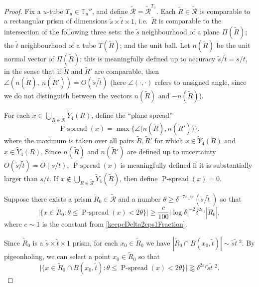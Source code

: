 \documentclass[letterpaper, reqno,11pt]{article}
\numberwithin{equation}{section}
\newcommand{\eps}{\varepsilon}
\newcommand{\tubes}{\mathbb{T}}
\numberwithin{thm}{section}
\theoremstyle{remark}
\begin{document}
\begin{proof}
\medskip


  Fix a $u$-tube $T_u\in\tubes_u''$, and define $\tilde{\mathcal{R}}=\tilde{\mathcal{R}}^{T_u}$. Each $\tilde R\in\tilde{\mathcal{R}}$ is comparable to a rectangular prism of dimensions $\tilde s\times\tilde t\times 1$, i.e.~$\tilde R$ is comparable to the intersection of the following three sets: the $\tilde s$ neighbourhood of a plane $\Pi(\tilde R)$; the $\tilde t$ neighbourhood of a tube $T(\tilde R)$; and the unit ball. Let $n(\tilde R)$ be the unit normal vector of $\Pi(\tilde R)$; this is meaningfully defined up to accuracy $\tilde s/ \tilde t=s/t$, in the sense that if $\tilde R$ and $\tilde R'$ are comparable, then $\angle(n(\tilde R),\ n(\tilde R')) = O(\tilde s/\tilde t)$ (here $\angle(\cdot,\cdot)$ refers to unsigned angle, since we do not distinguish between the vectors $n(\tilde R)$ and $-n(\tilde R)$). 



For each $x\in\bigcup_{\tilde R\in\tilde{\mathcal{R}}}\tilde Y_4(R)$, define the ``plane spread''
\[
\operatorname{P-spread}(x) = \max\Big\{\angle\big(n(\tilde R), n(\tilde R')\big)\Big\},
\]
where the maximum is taken over all pairs $\tilde R,\tilde R'$ for which $x\in \tilde Y_4(R)$ and $x\in \tilde Y_4(R)$. Since $n(\tilde R)$ and $n(\tilde R')$ are defined up to uncertainty $O(\tilde s/\tilde t)=O(s/t)$, $\operatorname{P-spread}(x)$ is meaningfully defined if it is substantially larger than $s/t$. If $x\not\in \bigcup_{\tilde R\in\tilde{\mathcal{R}}}\tilde Y_4(\tilde R)$, then define $\operatorname{P-spread}(x) =0$.

Suppose there exists a prism $\tilde R_0\in\tilde{\mathcal{R}}$ and a number $\theta\geq \delta^{-7\eps_1/\eps}(\tilde s /\tilde t\phantom{.})$ so that
\begin{equation}\label{largeSetLargeSpread}
\big|\{x \in \tilde R_0 \colon \theta\leq \operatorname{P-spread}(x)<2\theta\}\big|\geq \frac{c}{100}|\log\delta|^{-2}\delta^{2\eps_1}|\tilde R_0|,
\end{equation}
where $c\sim 1$ is the constant from \eqref{keepcDelta2eps1Fraction}.

Since $\tilde R_0$ is a $\tilde s\times \tilde t\times 1$ prism, for each $x_0\in \tilde R_0$ we have $|\tilde R_0 \cap B(x_0, \tilde t)|\sim \tilde s\tilde t\phantom{.}^2$. By pigeonholing, we can select a point $x_0\in \tilde R_0$ so that
\begin{equation}\label{largeSetLargeSpreadBall}
\big|\{x \in \tilde R_0 \cap B(x_0, \tilde t) \colon  \theta\leq \operatorname{P-spread}(x)<2\theta\}\big|\gtrapprox \delta^{2\eps_1}\tilde s \tilde t\phantom{.}^2.
\end{equation}



\end{proof}
\end{document}
